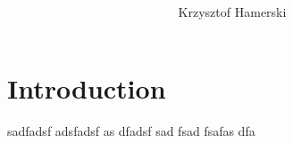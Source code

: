 \documentclass[oneside,openright,12pt,final,en]{mgr}
\title{ }
\author{Krzysztof Hamerski}
\begin{document}

\maketitle 
\tableofcontents

\chapter{Introduction}




sadfadsf adsfadsf as dfadsf sad fsad fsafas dfa



 \listoffigures
 \listoftables
\end{document}
